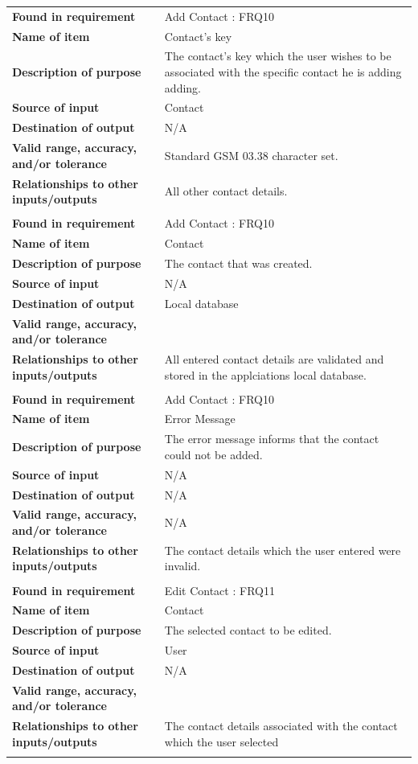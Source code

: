 \begin{tabular}{ll}
\textbf{Found in requirement}&Add Contact : FRQ10\\
\textbf{Name of item}&Contact's key\\
\textbf{Description of purpose}&The contact's key which the user wishes to be associated with the specific contact he is adding adding.\\
\textbf{Source of input}&Contact\\
\textbf{Destination of output}&N/A\\
\textbf{Valid range, accuracy, and/or tolerance}&Standard GSM 03.38 character set.\\
\textbf{Relationships to other inputs/outputs}&All other contact details.\\
&\\
\textbf{Found in requirement}&Add Contact : FRQ10\\
\textbf{Name of item}&Contact\\
\textbf{Description of purpose}&The contact that was created.\\
\textbf{Source of input}&N/A\\
\textbf{Destination of output}&Local database\\
\textbf{Valid range, accuracy, and/or tolerance}&\\
\textbf{Relationships to other inputs/outputs}&All entered contact details are validated and stored in the applciations local database.\\
&\\
\textbf{Found in requirement}&Add Contact : FRQ10\\
\textbf{Name of item}&Error Message\\
\textbf{Description of purpose}&The error message informs that the contact could not be added.\\
\textbf{Source of input}&N/A\\
\textbf{Destination of output}&N/A\\
\textbf{Valid range, accuracy, and/or tolerance}&N/A\\
\textbf{Relationships to other inputs/outputs}&The contact details which the user entered were invalid.\\
&\\
\textbf{Found in requirement}&Edit Contact : FRQ11\\
\textbf{Name of item}&Contact\\
\textbf{Description of purpose}&The selected contact to be edited.\\
\textbf{Source of input}&User\\
\textbf{Destination of output}&N/A\\
\textbf{Valid range, accuracy, and/or tolerance}&\\
\textbf{Relationships to other inputs/outputs}&The contact details associated with the contact which the user selected\\
&\\
\end{tabular}
